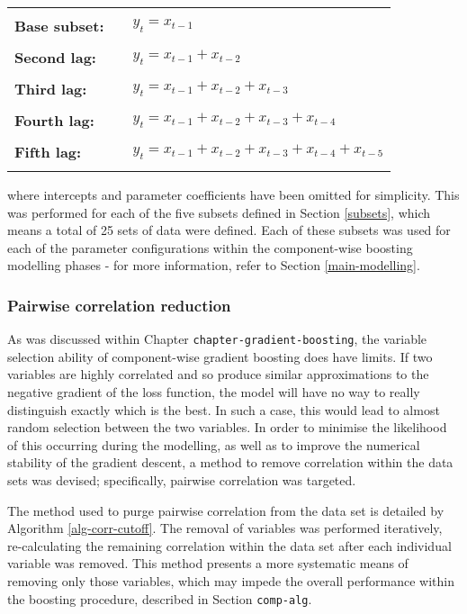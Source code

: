 \documentclass{article}
\begin{document}
\begin{center}
\begin{tabular}{lll}
 &  & \\
\textbf{Base subset:} &  & $y_t = x_{t-1}$\\
 &  & \\
\textbf{Second lag:} &  & $y_t = x_{t-1} + x_{t-2}$\\
 &  & \\
\textbf{Third lag:} &  & $y_t = x_{t-1} + x_{t-2} +x_{t-3}$\\
 &  & \\
\textbf{Fourth lag:} &  & $y_t = x_{t-1} + x_{t-2} +x_{t-3} +x_{t-4}$\\
 &  & \\
\textbf{Fifth lag:} &  & $y_t = x_{t-1} + x_{t-2} +x_{t-3} +x_{t-4} +x_{t-5}$\\
 &  & \\
\end{tabular}
\end{center}


where intercepts and parameter coefficients have been omitted for simplicity. This was performed for each of the five subsets defined in Section \ref{subsets}, which means a total of 25 sets of data were defined. Each of these subsets was used for each of the parameter configurations within the component-wise boosting modelling phases - for more information, refer to Section \ref{main-modelling}.


\subsubsection{Pairwise correlation reduction \label{pairwise-corr}}
\label{sec-1-2-5}

As was discussed within Chapter \texttt{chapter-gradient-boosting}, the variable selection ability of component-wise gradient boosting does have limits. If two variables are highly correlated and so produce similar approximations to the negative gradient of the loss function, the model will have no way to really distinguish exactly which is the best. In such a case, this would lead to almost random selection between the two variables. In order to minimise the likelihood of this occurring during the modelling, as well as to improve the numerical stability of the gradient descent, a method to remove correlation within the data sets was devised; specifically, pairwise correlation was targeted. 

The method used to purge pairwise correlation from the data set is detailed by Algorithm \eqref{alg-corr-cutoff}. The removal of variables was performed iteratively, re-calculating the remaining correlation within the data set after each individual variable was removed. This method presents a more systematic means of removing only those variables, which may impede the overall performance within the boosting procedure, described in Section \texttt{comp-alg}.
\end{document}
